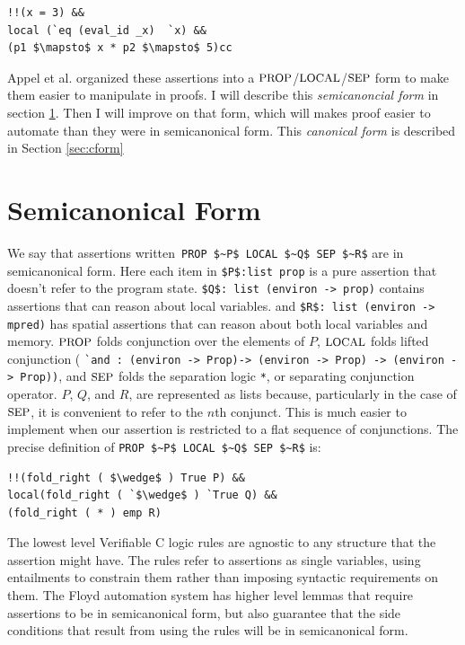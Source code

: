 \documentclass{puthesis}
\begin{document}
\begin{lstlisting}
!!(x = 3) &&
local (`eq (eval_id _x)  `x) &&
(p1 $\mapsto$ x * p2 $\mapsto$ 5)cc
\end{lstlisting}

Appel et al. organized these assertions into a $\mbox{\small PROP}$/$\mbox{\small LOCAL}$/$\mbox{\small SEP}$
form to make them easier to manipulate in proofs. I will describe this
\emph{semicanoncial form} in section \ref{sec:scform}. Then I will
improve on that form, which will makes proof easier to automate than
they were in semicanonical form. This \emph{canonical form} is
described in Section \ref{sec:cform}

\section{Semicanonical Form}
\label{sec:scform}
We say that assertions written~\lstinline{PROP $~P$ LOCAL $~Q$ SEP $~R$}  
are in semicanonical form. Here each item in
\lstinline|$P$:list prop| is a pure assertion that doesn't refer to
the program state. \lstinline|$Q$: list (environ -> prop)| contains
assertions that can reason about local variables.  and 
\lstinline|$R$: list (environ -> mpred)| has spatial assertions that can reason about
both local variables and memory.  $\mbox{\small PROP}$ folds conjunction over the
elements of $P$, $\mbox{\small LOCAL}$ folds lifted conjunction ( 
\lstinline|`and : (environ -> Prop)-> (environ -> Prop) -> (environ -> Prop))|, and
$\mbox{\small SEP}$ folds the separation logic \lstinline|*|, or separating
conjunction operator. $P$, $Q$, and $R$, are represented as lists
because, particularly in the case of $\mbox{\small SEP}$, it is convenient to refer
to the $n$th conjunct. This is much easier to implement when our
assertion is restricted to a flat sequence of conjunctions. The
precise definition of \lstinline{PROP $~P$ LOCAL $~Q$ SEP $~R$} is:
\pagebreak
\begin{lstlisting}
!!(fold_right ( $\wedge$ ) True P) &&
local(fold_right ( `$\wedge$ ) `True Q) &&
(fold_right ( * ) emp R)
\end{lstlisting}

The lowest level Verifiable C logic rules are agnostic to any
structure that the assertion might have. The rules refer to
assertions as single variables, using entailments to constrain them
rather than imposing syntactic requirements on them. The Floyd
automation system has higher level lemmas that require assertions
to be in semicanonical form, but also guarantee that the side
conditions that result from using the rules will be in semicanonical
form.
\end{document}
